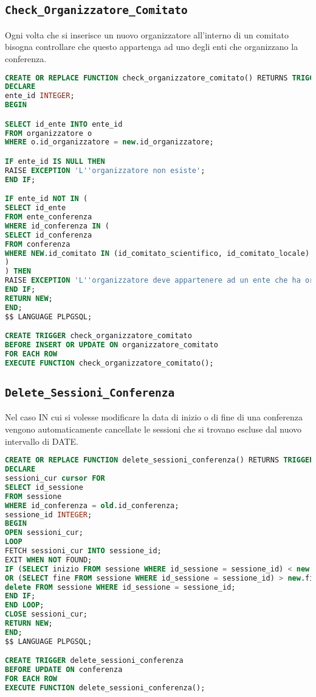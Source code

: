 \subsection{\texttt{Check\_Organizzatore\_Comitato}}
Ogni volta che si inserisce un nuovo organizzatore all'interno di un comitato bisogna controllare che questo appartenga ad uno degli enti che organizzano la conferenza.
\begin{lstlisting}[language=SQL, style=mystyle, caption={\texttt{Check\_organizzatori\_comitato}}]
CREATE OR REPLACE FUNCTION check_organizzatore_comitato() RETURNS TRIGGER AS $$
DECLARE
ente_id INTEGER;
BEGIN

SELECT id_ente INTO ente_id
FROM organizzatore o
WHERE o.id_organizzatore = new.id_organizzatore;

IF ente_id IS NULL THEN
RAISE EXCEPTION 'L''organizzatore non esiste';
END IF;

IF ente_id NOT IN (
SELECT id_ente
FROM ente_conferenza
WHERE id_conferenza IN (
SELECT id_conferenza
FROM conferenza
WHERE NEW.id_comitato IN (id_comitato_scientifico, id_comitato_locale)
)
) THEN
RAISE EXCEPTION 'L''organizzatore deve appartenere ad un ente che ha organizzato la conferenza';
END IF;
RETURN NEW;
END;
$$ LANGUAGE PLPGSQL;

CREATE TRIGGER check_organizzatore_comitato
BEFORE INSERT OR UPDATE ON organizzatore_comitato
FOR EACH ROW
EXECUTE FUNCTION check_organizzatore_comitato();
\end{lstlisting}
\subsection{\texttt{Delete\_Sessioni\_Conferenza}}
Nel caso IN cui si volesse modificare la data di inizio o di fine di una conferenza vengono automaticamente cancellate le sessioni che si trovano escluse dal nuovo intervallo di DATE.
\begin{lstlisting}[language=SQL, style=mystyle, caption={\texttt{delete\_sessioni\_conferenza}}]
CREATE OR REPLACE FUNCTION delete_sessioni_conferenza() RETURNS TRIGGER AS $$
DECLARE
sessioni_cur cursor FOR 
SELECT id_sessione 
FROM sessione 
WHERE id_conferenza = old.id_conferenza;
sessione_id INTEGER;
BEGIN
OPEN sessioni_cur;
LOOP
FETCH sessioni_cur INTO sessione_id;
EXIT WHEN NOT FOUND;
IF (SELECT inizio FROM sessione WHERE id_sessione = sessione_id) < new.inizio 
OR (SELECT fine FROM sessione WHERE id_sessione = sessione_id) > new.fine THEN
delete FROM sessione WHERE id_sessione = sessione_id;
END IF;
END LOOP;
CLOSE sessioni_cur;
RETURN NEW;
END;
$$ LANGUAGE PLPGSQL;

CREATE TRIGGER delete_sessioni_conferenza
BEFORE UPDATE ON conferenza
FOR EACH ROW
EXECUTE FUNCTION delete_sessioni_conferenza();
\end{lstlisting}

